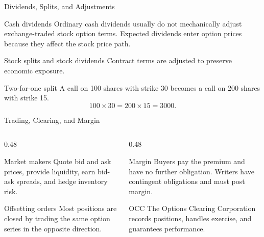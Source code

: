 \documentclass[aspectratio=169,11pt]{beamer}
\begin{document}
\begin{frame}{Dividends, Splits, and Adjustments}
    \begin{block}{Cash dividends}
        Ordinary cash dividends usually do not mechanically adjust exchange-traded stock option terms.
        Expected dividends enter option prices because they affect the stock price path.
    \end{block}

    \begin{block}{Stock splits and stock dividends}
        Contract terms are adjusted to preserve economic exposure.
    \end{block}

    \begin{exampleblock}{Two-for-one split}
        A call on 100 shares with strike 30 becomes a call on 200 shares with strike 15.
        \[
            100\times 30=200\times 15=3000.
        \]
    \end{exampleblock}
\end{frame}

\begin{frame}{Trading, Clearing, and Margin}
    \begin{columns}[T]
        \begin{column}{0.48\textwidth}
            \begin{block}{Market makers}
                Quote bid and ask prices, provide liquidity, earn bid-ask spreads, and hedge inventory risk.
            \end{block}

            \begin{block}{Offsetting orders}
                Most positions are closed by trading the same option series in the opposite direction.
            \end{block}
        \end{column}
        \begin{column}{0.48\textwidth}
            \begin{block}{Margin}
                Buyers pay the premium and have no further obligation.
                Writers have contingent obligations and must post margin.
            \end{block}

            \begin{block}{OCC}
                The Options Clearing Corporation records positions, handles exercise, and guarantees performance.
            \end{block}
        \end{column}
    \end{columns}
\end{frame}
\end{document}
